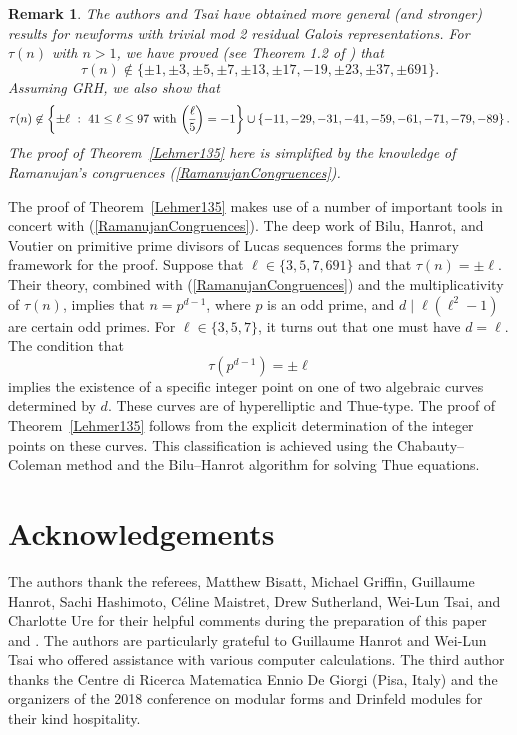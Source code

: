 \documentclass[12pt]{amsart}
\newtheorem*{remark}{Remark}
\newcommand{\leg}[2]{\genfrac{(}{)}{}{}{#1}{#2}}
\numberwithin{equation}{section}
\begin{document}
\begin{remark} The authors and Tsai have obtained more general  (and stronger) results  \cite{BCO} for newforms with trivial mod 2 residual Galois representations.
For $\tau(n)$ with $n>1$, we have proved (see Theorem 1.2 of \cite{BCO})  that  $$\tau(n)\not \in \{\pm 1, \pm 3, \pm 5, \pm 7, \pm 13, \pm 17, -19, \pm 23,  \pm 37, \pm 691\}.$$
Assuming GRH, we also show that $$\tau(n)\not \in 
\left \{ \pm  \ell\ : \ 41\leq  \ell\leq 97  \  {\text {\rm with}}\ \leg{\ell}{5}=-1\right\} \cup
\left \{-11, -29, -31, -41, -59, -61, -71, -79, -89\right\}.
$$
The proof of Theorem~\ref{Lehmer135} here is simplified by the knowledge of Ramanujan's congruences (\ref{RamanujanCongruences}).
\end{remark}

The proof of Theorem~\ref{Lehmer135} makes use of a number of important tools in concert with (\ref{RamanujanCongruences}).
The deep work of Bilu, Hanrot, and Voutier \cite{BHV} on primitive prime divisors of Lucas sequences forms the primary framework for the proof. Suppose that $\ell \in \{3, 5, 7, 691\}$ and that $\tau(n)=\pm \ell$.
Their theory, combined with (\ref{RamanujanCongruences}) and the multiplicativity of $\tau(n)$, implies that $n=p^{d-1}$, where $p$  is an odd prime, and $d\mid \ell (\ell^2-1)$ are certain odd primes. For $\ell \in \{3, 5, 7\}$, it turns out that one must have $d=\ell$.
The condition that
$$
\tau(p^{d-1})=\pm \ell
$$
implies the existence of a specific integer point on one of two algebraic curves determined by $d$. These 
curves are of hyperelliptic and Thue-type. The proof of Theorem~\ref{Lehmer135}
follows from the explicit determination of the integer points on these curves. This classification is achieved using the Chabauty--Coleman method \cite{coleman}
and the Bilu--Hanrot algorithm \cite{BH96} for solving Thue equations.

\section*{Acknowledgements} 
\noindent
The authors thank the referees, Matthew Bisatt, Michael Griffin, Guillaume Hanrot, Sachi Hashimoto, C\'eline Maistret, Drew Sutherland, Wei-Lun Tsai, and Charlotte Ure for their helpful comments during the preparation of this paper and \cite{BCO}. The authors are particularly grateful to Guillaume Hanrot and Wei-Lun Tsai who
offered assistance with various computer calculations.
The third author thanks the Centre di Ricerca Matematica Ennio De Giorgi (Pisa, Italy) and the organizers of the 2018 conference on modular forms and Drinfeld modules for their kind hospitality.
\end{document}

